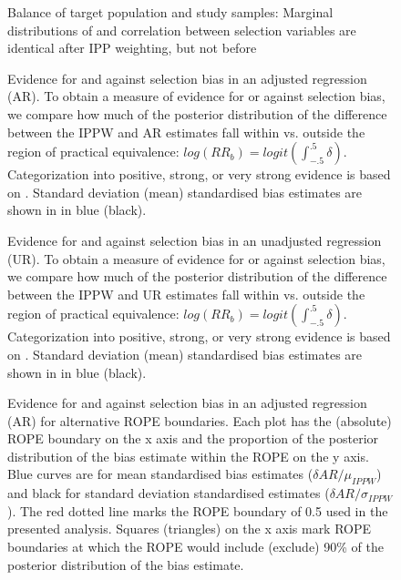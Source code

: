 \documentclass[12pt]{article}
\begin{document}
\begin{figure}[H]
	\centering
		
	\caption{Balance of target population and study samples: Marginal distributions of and correlation between selection variables are identical after IPP weighting, but not before}
	\label{fig:IPWbalance}
\end{figure}



\begin{figure}[H]
	\caption{Evidence for and against selection bias in an adjusted regression (AR). To obtain a measure of evidence for or against selection bias, we compare how much of the posterior distribution of the difference between the IPPW and AR estimates fall within vs. outside the region of practical equivalence: $log(RR_b) = logit(\int_{-.5}^{.5}\delta)$. Categorization into positive, strong, or very strong evidence is based on \cite{Kass1995-uv}. Standard deviation (mean) standardised bias estimates are shown in in blue (black).} 
	\label{fig:logRRsAR}
\end{figure}

\begin{figure}[H]
	\caption{Evidence for and against selection bias in an unadjusted regression (UR). To obtain a measure of evidence for or against selection bias, we compare how much of the posterior distribution of the difference between the IPPW and UR estimates fall within vs. outside the region of practical equivalence: $log(RR_b) = logit(\int_{-.5}^{.5}\delta)$. Categorization into positive, strong, or very strong evidence is based on \cite{Kass1995-uv}. Standard deviation (mean) standardised bias estimates are shown in in blue (black).} 
	\label{fig:logRRsUR}
\end{figure}

\begin{figure}[H]
	\centering 
	\caption{Evidence for and against selection bias in an adjusted regression (AR) for alternative ROPE boundaries. Each plot has the (absolute) ROPE boundary on the x axis and the proportion of the posterior distribution of the bias estimate within the ROPE on the y axis. Blue curves are for mean standardised bias estimates ($\delta{AR}/\mu_{IPPW}$) and black for standard deviation standardised estimates ($\delta{AR}/\sigma_{IPPW}$). The red dotted line marks the ROPE boundary of 0.5 used in the presented analysis. Squares (triangles) on the x axis mark ROPE boundaries at which the ROPE would include (exclude) 90\% of the posterior distribution of the bias estimate.}
	\label{fig:ropeplotsAR}
\end{figure}
\end{document}
